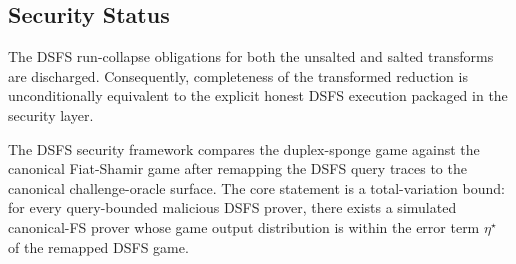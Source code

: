 \subsection{Security Status}\label{sec:fiat_shamir_security}

\begin{theorem}
    \label{thm:duplex_sponge_completeness_unroll}
    The DSFS run-collapse obligations for both the unsalted and salted transforms are discharged.
    Consequently, completeness of the transformed reduction is unconditionally equivalent to the
    explicit honest DSFS execution packaged in the security layer.
\end{theorem}

\begin{definition}
    \label{def:duplex_sponge_key_lemma}
    The DSFS security framework compares the duplex-sponge game against the canonical
    Fiat-Shamir game after remapping the DSFS query traces to the canonical challenge-oracle
    surface. The core statement is a total-variation bound: for every query-bounded malicious
    DSFS prover, there exists a simulated canonical-FS prover whose game output distribution is
    within the error term $\eta^\star$ of the remapped DSFS game.
\end{definition}

